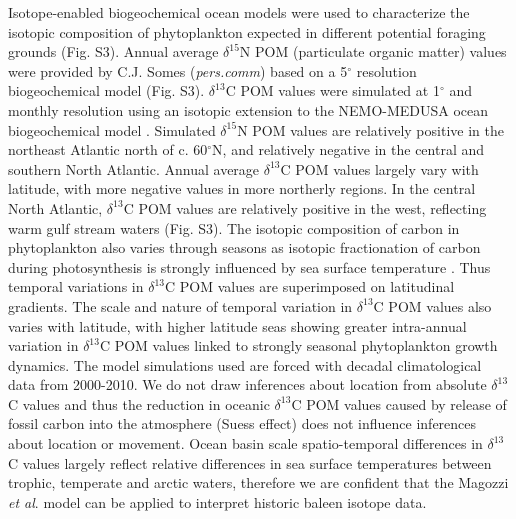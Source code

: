 \documentclass[a4paper,12pt]{article}
\begin{document}
Isotope-enabled biogeochemical ocean models \cite{magozzi2017using,schmittner2016complementary} were used to characterize
the isotopic composition of phytoplankton expected in different
potential foraging grounds (Fig. S3). 
Annual average \(\delta^{15}\)N POM (particulate organic matter) values were provided by C.J. Somes (\textit{pers.comm}) based on a 5\({}^{\circ}\) resolution biogeochemical model (Fig. S3). \(\delta^{13}\)C POM values were simulated at 1\({}^{\circ}\) and monthly resolution using an isotopic extension to the NEMO-MEDUSA ocean biogeochemical model \cite{magozzi2017using,yool2013medusa}. 
Simulated \(\delta^{15}\)N POM values are relatively positive in the northeast Atlantic north of c. 60\({}^{\circ}\)N, and relatively negative in the central and southern North Atlantic. 
Annual average \(\delta^{13}\)C POM values largely vary with latitude, with more negative values in more northerly regions. 
In the central North Atlantic, \(\delta^{13}\)C POM values are relatively positive in the west, reflecting warm gulf stream waters (Fig. S3). 
The isotopic composition of carbon in phytoplankton also varies through seasons as isotopic fractionation of carbon during photosynthesis is strongly influenced by sea surface temperature \cite{magozzi2017using,laws1995dependence}. 
Thus temporal variations in \(\delta^{13}\)C POM values are superimposed on latitudinal gradients. 
The scale and nature of temporal variation in \(\delta^{13}\)C POM values also varies with latitude, with higher latitude seas showing greater intra-annual variation in \(\delta^{13}\)C POM values linked to strongly seasonal phytoplankton growth dynamics.
The model simulations used are forced with decadal climatological data from 2000-2010\cite{magozzi2017using}. 
We do not draw inferences about location from absolute \(\delta^{13}\)C values and thus the reduction in oceanic \(\delta^{13}\)C POM values caused by release of fossil carbon into the atmosphere (Suess effect) does not influence inferences about location or movement. 
Ocean basin scale spatio-temporal differences in \(\delta^{13}\)C values largely reflect relative differences in sea surface temperatures between trophic, temperate and arctic waters, therefore we are confident that the Magozzi \textit{et al}.\cite{magozzi2017using} model can be applied to interpret historic baleen isotope data.
\end{document}
